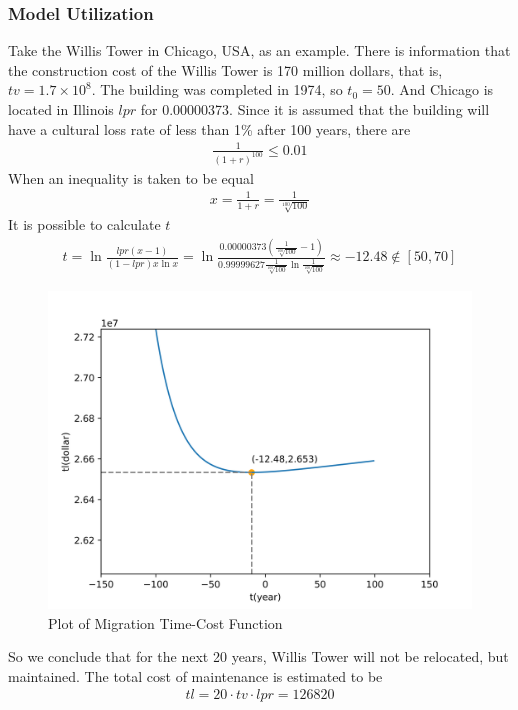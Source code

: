\documentclass[12pt]{article}  %
\begin{document}
\subsubsection{Model Utilization}
Take the Willis Tower in Chicago, USA, as an example.
There is information that the construction cost of the Willis Tower is 170 million dollars, that is, $tv=1.7 \times 10^8$. The building was completed in 1974, so $t_0 = 50$. And Chicago is located in Illinois $lpr$ for 0.00000373.
Since it is assumed that the building will have a cultural loss rate of less than 1\% after 100 years, there are
\begin{align*}
    \frac{1}{(1+r)^{100}} \leq  0.01
\end{align*}
When an inequality is taken to be equal
\begin{align*}
    x= \frac{1}{1+r}=\frac{1}{ \sqrt[100]{100} }
\end{align*}
It is possible to calculate $t$
\begin{align*}
    t=\ln  \frac{lpr(x-1)}{(1-lpr)x\ln x}=\ln  \frac{0.00000373( \frac{1}{ \sqrt[100]{100} } -1)}{0.99999627\frac{1}{ \sqrt[100]{100} }\ln \frac{1}{ \sqrt[100]{100} }}\approx -12.48 \notin [50,70]
\end{align*}

\clearpage

\begin{figure}[htbp]
\centering
\includegraphics[width=.7\textwidth]{img/img06.png}
\caption{Plot of Migration Time-Cost Function}
\end{figure}

So we conclude that for the next 20 years, Willis Tower will not be relocated, but maintained. The total cost of maintenance is estimated to be 
\begin{align*}
    tl=20 \cdot tv \cdot lpr = 126820
\end{align*}
\end{document}
